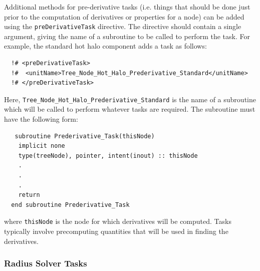 Additional methods for pre-derivative tasks (i.e. things that should be done just prior to the computation of derivatives or properties for a node) can be added using the {\tt preDerivativeTask} directive. The directive should contain a single argument, giving the name of a subroutine to be called to perform the task. For example, the standard hot halo component adds a task as follows:
\begin{verbatim}
  !# <preDerivativeTask>
  !#  <unitName>Tree_Node_Hot_Halo_Prederivative_Standard</unitName>
  !# </preDerivativeTask>
\end{verbatim}
Here, {\tt Tree\_Node\_Hot\_Halo\_Prederivative\_Standard} is the name of a subroutine which will be called to perform whatever tasks are required. The subroutine must have the following form:
\begin{verbatim}
   subroutine Prederivative_Task(thisNode)
    implicit none
    type(treeNode), pointer, intent(inout) :: thisNode
    .
    .
    .
    return
  end subroutine Prederivative_Task
\end{verbatim}
where {\tt thisNode} is the node for which derivatives will be computed. Tasks typically involve precomputing quantities that will be used in finding the derivatives.

\subsubsection{Radius Solver Tasks}\label{sec:radius_solver}

